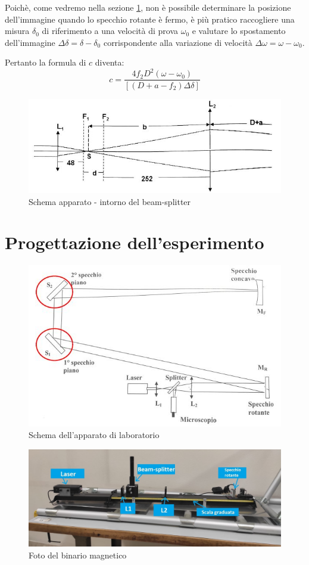 \documentclass{article}
\begin{document}
Poichè, come vedremo nella sezione \ref{Prog_esperimento}, non è possibile determinare la posizione dell'immagine quando lo specchio rotante è fermo,
è più pratico raccogliere una misura $\delta_0$ di riferimento a una velocità di prova $\omega_0$ e valutare lo spostamento dell'immagine $\Delta\delta = \delta-\delta_0$
corrispondente alla variazione di velocità $\Delta\omega = \omega-\omega_0$.

Pertanto la formula di $c$ diventa:
\begin{equation}
    c = \frac{4f_2D^2(\omega-\omega_0)}{[(D+a-f_2)\Delta\delta]}
    \label{c_equation}
\end{equation}

\begin{figure}[h]
    \centering
        \includegraphics[width=0.6\linewidth]{IntroTeorica1.JPG}
    \caption{Schema apparato - intorno del beam-splitter}
\end{figure}


\newpage

\section{Progettazione dell'esperimento} \label{Prog_esperimento}

\begin{figure}[h] 
    \centering
    \includegraphics[width=0.55\linewidth]{Progettazione1.JPG}
    \caption{Schema dell'apparato di laboratorio}
    \label{schema_apparato}
\end{figure}

\begin{figure}[h]
    \centering
    \includegraphics[width=0.55\linewidth]{FotoBinario.jpg}
    \caption{Foto del binario magnetico}
    \label{FotoBinario}
\end{figure}
\end{document}
